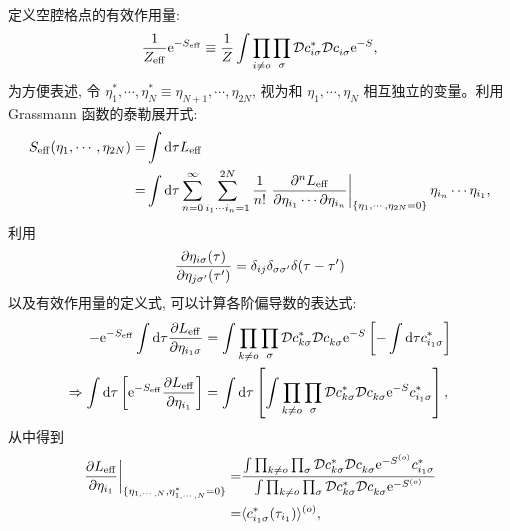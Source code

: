 定义空腔格点的有效作用量:
\begin{equation}
    \frac{1}{Z_{\mathrm{eff}}}\mathrm{e}^{-S_{\mathrm{eff}}}\equiv \frac{1}{Z}\int\prod_{i\ne o}\prod_{\sigma}\mathcal{D}c_{i\sigma}^*\mathcal{D}c_{i\sigma}^{ }\mathrm{e}^{-S},
\end{equation}
为方便表述, 令 $\eta_1^*,\cdots,\eta_{N}^*\equiv \eta_{N+1},\cdots,\eta_{2N}$, 视为和 $\eta_1,\cdots,\eta_{N}$ 相互独立的变量。利用 Grassmann 函数的泰勒展开式:
\begin{equation}
    \begin{aligned}
        S_{\mathrm{eff}}(\eta_{1},\cdots,\eta_{2N})=&\int\mathrm{d}\tau L_{\mathrm{eff}}\\
        =&\int\mathrm{d}\tau\sum_{n=0}^\infty\sum_{i_1\cdots i_n=1}^{2N}\frac{1}{n!}\left.\frac{\partial^n L_{\mathrm{eff}}}{\partial\eta_{i_1}\cdots\partial \eta_{i_n}}\right|_{\{\eta_1,\cdots,\eta_{2N}=0\}}\eta_{i_n}\cdots\eta_{i_1},
    \end{aligned}
\end{equation}
利用 
\begin{equation}
    \frac{\partial \eta_{i\sigma}(\tau)}{\partial \eta_{j\sigma'}(\tau')}=\delta_{ij}\delta_{\sigma\sigma'}\delta(\tau-\tau')
\end{equation}
以及有效作用量的定义式, 可以计算各阶偏导数的表达式:
\begin{equation}
    \begin{aligned}
        -\mathrm{e}^{-S_{\mathrm{eff}}}\int\mathrm{d}\tau\frac{\partial L_{\mathrm{eff}}}{\partial \eta_{i_1\sigma}}&=\int\prod_{k\ne o}\prod_\sigma\mathcal{D}c_{k\sigma}^*\mathcal{D}c_{k\sigma}^{ }\mathrm{e}^{-S}\left[ -\int\mathrm{d}\tau c_{i_1\sigma}^*\right]\\
        \Rightarrow \int\mathrm{d}\tau\left[ \mathrm{e}^{-S_{\mathrm{eff}}}\frac{\partial L_{\mathrm{eff}}}{\partial \eta_{i_1}} \right] &=\int\mathrm{d}\tau\left[ \int\prod_{k\ne o}\prod_\sigma\mathcal{D}c_{k\sigma}^*\mathcal{D}c_{k\sigma}^{ }\mathrm{e}^{-S} c_{i_1\sigma}^* \right],
    \end{aligned}
\end{equation}
从中得到 
\begin{equation}
    \begin{aligned}
        \left.\frac{\partial L_{\mathrm{eff}}}{\partial \eta_{i_1}}\right|_{\{\eta_{1,\cdots,N},\eta_{1,\cdots,N}^*=0\}}=&\frac{\int\prod_{k\ne o}\prod_{\sigma}\mathcal{D}c_{k\sigma}^*\mathcal{D} c_{k\sigma}^{ }\mathrm{e}^{-S^{(o)}}c_{i_1\sigma}^*}{\int\prod_{k\ne o}\prod_{\sigma}\mathcal{D}c_{k\sigma}^*\mathcal{D} c_{k\sigma}^{ }\mathrm{e}^{-S^{(o)}}}\\
        =&\langle c^*_{i_1\sigma}(\tau_{i_1}) \rangle^{(o)},
    \end{aligned}
\end{equation}

